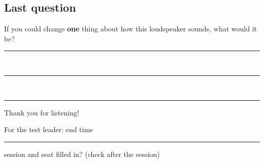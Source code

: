 \documentclass[11pt,a4paper]{article}
\begin{document}
\subsection*{Last question}
If you could change \textbf{one} thing about how this loudspeaker sounds, what would it be?\\[4pt]
\rule{\linewidth}{0.4pt}\\[10pt]
\rule{\linewidth}{0.4pt}\\[10pt]
\rule{\linewidth}{0.4pt}

\vfill
\begin{center}\large Thank you for listening!\end{center}
\vspace{2pt}
{\footnotesize\color{gray} For the test leader: end time \rule{1.6cm}{0.4pt} \quad session and seat filled in? \quad (check after the session)}
\end{document}
